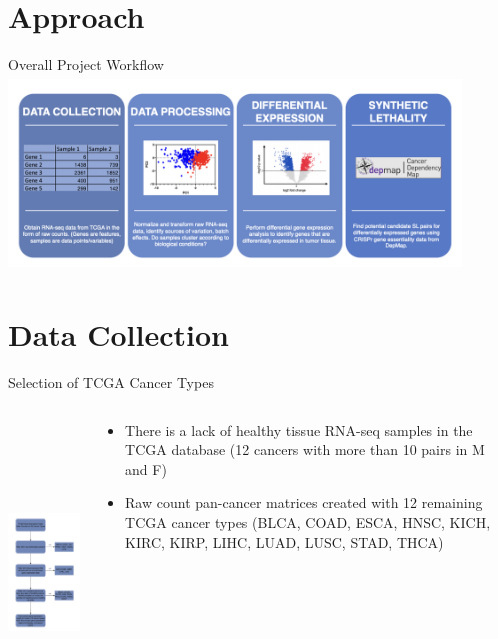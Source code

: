 \documentclass{beamer}
\begin{document}
	
	\section{Approach}
	\begin{frame}{Overall Project Workflow}
		\includegraphics[width=12cm, height=5.2cm]{img2.png}
	\end{frame}

	\section{Data Collection}
	\begin{frame}{Selection of TCGA Cancer Types}
			\begin{columns}
				\begin{column}{0.45\textwidth}
					\includegraphics[width=5cm, height=8cm]{img3.png}
				\end{column}
				\begin{column}{0.5\textwidth}
					\begin{itemize}
						\item There is a lack of healthy tissue RNA-seq samples in the TCGA database (12 cancers with more than 10 pairs in M and F)
						\item Raw count pan-cancer matrices created with 12 remaining TCGA cancer types (BLCA, COAD, ESCA, HNSC, KICH, KIRC, KIRP, LIHC, LUAD, LUSC, STAD, THCA)
					\end{itemize}
				\end{column}
			\end{columns}			
	\end{frame}
\end{document}
